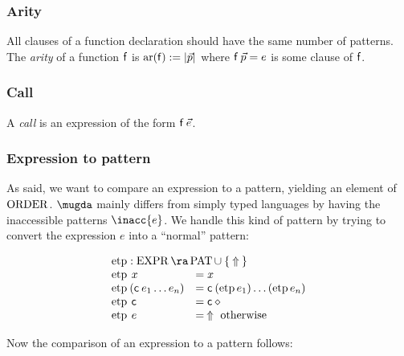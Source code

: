 \newcommand{\cmp}{\opn{cmp}}
\newcommand{\cmpv}{\opn{cmp_v}}
\newcommand{\cmps}{\opn{cmps}}
\newcommand{\cmpsv}{\opn{cmpsv}}
\newcommand{\etp}{\opn{etp}}
\newcommand{\extr}{\opn{extr}}

\newcommand{\ar}{\opn{ar}}

\subsubsection{Arity}
All clauses of a function declaration should have the same number of patterns.\\
The \emph{arity} of a function $\mathsf{f}$  is $\ar(\ff) := \vert \vec{p} \vert $ where $\mathsf{f} \: \vec{p} = e $ is some clause of $\mathsf{f}$.   

\subsubsection{Call}
A \emph{call} is an expression of the form $\mathsf{f} \: \vec{e}$.


\subsubsection{Expression to pattern}

As said, we want to compare an expression to a pattern, yielding an element of $\operatorname{ORDER}$.
$\mugda$ mainly differs from simply typed languages by having the inaccessible patterns $\inacc{e}$.
We handle this kind of pattern by trying to convert the expression $e$ into a ``normal'' pattern:

\[
\begin{array}[t]{ll}
\multicolumn{2}{l}{\etp : \Expr \ra \Pat \cup \: \{ \: \stuck \: \} }\\ 
\etp \: x & = x \\
\etp \: (\cc \: e_1 \ldots e_n ) & = \cc \: (\etp e_1) \ldots (\etp e_n) \\
\etp \: \cc & = \cc \: \diamond \\
\etp \: e & = \: \stuck \mbox{ otherwise}
\end{array}
\]

\noindent Now the comparison of an expression to a pattern follows: 

